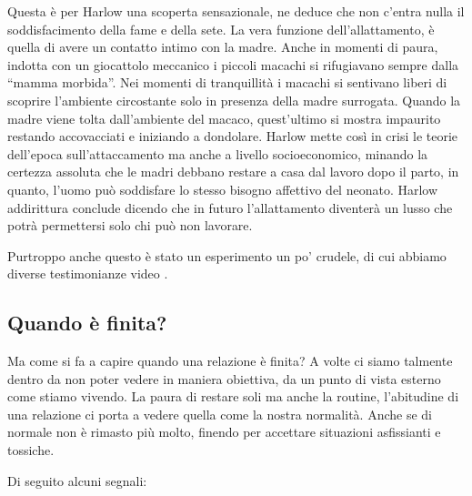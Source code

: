 \documentclass[12pt]{book} %
\begin{document}
\begin{mdframed}[linewidth=1pt]
Questa è per Harlow una scoperta sensazionale, ne deduce che non c'entra nulla il soddisfacimento
della fame e della sete. La vera funzione dell'allattamento, è quella di avere un contatto intimo
con la madre. Anche in momenti di paura, indotta con un giocattolo meccanico i piccoli macachi si rifugiavano sempre
dalla “mamma morbida”. Nei momenti di tranquillità i macachi si sentivano liberi di scoprire
l'ambiente circostante solo in presenza della madre surrogata. Quando la madre viene tolta
dall'ambiente del macaco, quest'ultimo si mostra impaurito restando
accovacciati e iniziando a dondolare. Harlow mette così in crisi le teorie dell'epoca
sull'attaccamento ma anche a livello socioeconomico, minando la certezza assoluta che le madri
debbano restare a casa dal lavoro dopo il parto, in quanto, l'uomo può soddisfare lo stesso
bisogno affettivo del neonato. Harlow addirittura conclude dicendo che in futuro l'allattamento
diventerà un lusso che potrà permettersi solo chi può non lavorare.
\end{mdframed}

\bigskip

Purtroppo anche questo è stato un esperimento un po' crudele, di cui abbiamo diverse testimonianze
video
. 

\subsection{Quando è finita?}
Ma come si fa a capire quando una relazione è finita? A volte ci siamo talmente dentro da non poter vedere in maniera
obiettiva, da un punto di vista esterno come stiamo vivendo. La paura di restare soli ma anche la routine,
l'abitudine di una relazione ci porta a vedere quella come la nostra normalità. Anche se di
normale non è rimasto più molto, finendo per accettare situazioni asfissianti e tossiche. 


\bigskip

Di seguito alcuni
segnali:
\end{document}

